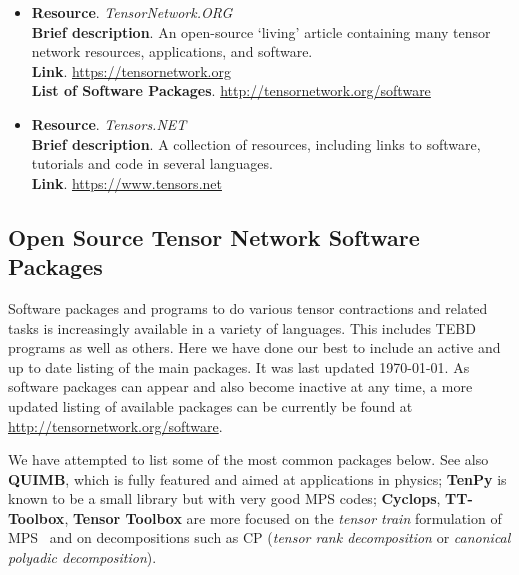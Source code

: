 \begin{itemize}
  \item[1.] {\sf \bf Resource}. \hfill {\it TensorNetwork.ORG}  \\ 
    {\sf \bf Brief description}. An open-source `living' article containing many tensor network resources, applications, and software.\\ 
{\sf \bf Link}. \url{https://tensornetwork.org} \\
{\sf \bf List of Software Packages}. \url{http://tensornetwork.org/software}

\item[2.] {\sf \bf Resource}. \hfill {\it Tensors.NET} \\ 
{\sf \bf Brief description}. A collection of resources, including links to software, tutorials and code in several languages. \\
{\sf \bf Link}. \url{https://www.tensors.net}
\end{itemize}


\subsection{Open Source Tensor Network Software Packages} 
Software packages and programs to do various tensor contractions and related tasks is increasingly available in a variety of languages.  This includes TEBD programs as well as others.  Here we have done our best to include an active and up to date listing of the main packages.  It was last updated \today.  As software packages can appear and also become inactive at any time, a more updated listing of available packages can be currently be found at \url{http://tensornetwork.org/software}. 

We have attempted to list some of the most common packages below. See also {\bf QUIMB}, which is fully featured and aimed at applications in physics; {\bf TenPy} is known to be a small library but with very good MPS codes; {\bf Cyclops}, {\bf TT-Toolbox}, {\bf Tensor Toolbox} are more focused on the {\it tensor train} formulation of MPS~\cite{Oseledets2011} and on decompositions such as CP ({\it tensor rank decomposition} or {\it canonical polyadic decomposition}). 

